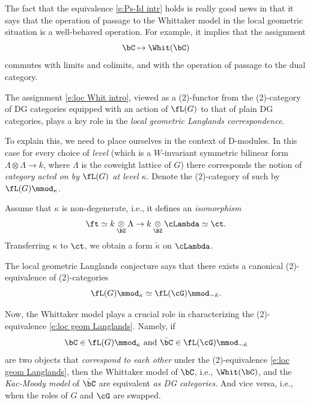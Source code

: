 \documentclass[9pt]{amsart}
\theoremstyle{definition}
\theoremstyle{remark}
\numberwithin{equation}{section}
\begin{document}
\sssec{}

The fact that the equivalence \eqref{e:Ps-Id intr} holds is really good news in that it says that the operation of passage
to the Whittaker model in the local geometric situation is a well-behaved operation. For example, it implies that the
assignment 
\begin{equation} \label{e:loc Whit intro}
\bC\mapsto \Whit(\bC)
\end{equation}
commutes with limits and colimits, and with the operation of passage to the dual category. 


The assignment \eqref{e:loc Whit intro}, viewed as a (2)-functor from the (2)-category of DG categories
equipped with an action of $\fL(G)$ to that of plain DG categories, plays a key role in the 
\emph{local geometric Langlands correspondence}. 

\medskip

To explain this, we need to place ourselves in the context of D-modules. In this case for every choice of 
\emph{level} (which is a $W$-invariant symmetric bilinear form $\Lambda\otimes \Lambda \to k$, where
$\Lambda$ is the coweight lattice of $G$) there corresponds the notion of \emph{category acted on by 
$\fL(G)$ at level $\kappa$}.  Denote the (2)-category of such by $\fL(G)\mmod_\kappa$.

\medskip

Assume that $\kappa$ is non-degenerate, i.e., it defines an \emph{isomorphism}
$$\ft\simeq k\underset{\BZ}\otimes \Lambda\to k\underset{\BZ}\otimes \cLambda\simeq \ct.$$
Transferring $\kappa$ to $\ct$, we obtain a form $\check\kappa$ on $\cLambda$. 

\medskip

The local geometric Langlands conjecture says that there exists a canonical (2)-equivalence of (2)-categories
\begin{equation} \label{e:loc geom Langlands}
\fL(G)\mmod_\kappa\simeq \fL(\cG)\mmod_{-\check\kappa}.
\end{equation}

\medskip

Now, the Whittaker model plays a crucial role in characterizing the (2)-equivalence \eqref{e:loc geom Langlands}. 
Namely, if 
$$\bC\in \fL(G)\mmod_\kappa \text{ and } \check\bC\in  \fL(\cG)\mmod_{-\check\kappa}$$
are two objects that \emph{correspond to each other} under the (2)-equivalence \eqref{e:loc geom Langlands},
then the Whittaker model of $\bC$, i.e., $\Whit(\bC)$, and the \emph{Kac-Moody model} of $\check\bC$ 
are equivalent \emph{as DG categories}. And vice versa, i.e., when the roles of $G$ and $\cG$ are swapped.  
\end{document}
